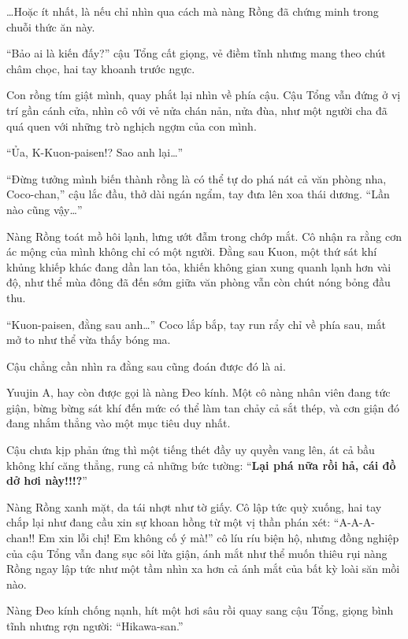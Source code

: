 \documentclass[../main.tex]{subfiles}
\begin{document}
\omk

\dots Hoặc ít nhất, là nếu chỉ nhìn qua cách mà nàng Rồng đã chứng minh trong chuỗi thức ăn này.

``Bảo ai là kiến đấy?'' cậu Tổng cất giọng, vẻ điềm tĩnh nhưng mang theo chút châm chọc, hai tay khoanh trước ngực.

Con rồng tím giật mình, quay phắt lại nhìn về phía cậu. Cậu Tổng vẫn đứng ở vị trí gần cánh cửa, nhìn cô với vẻ nửa chán nản, nửa đùa, như một người cha đã quá quen với những trò nghịch ngợm của con mình.

``Ủa, K-Kuon-paisen!? Sao anh lại\dots''

``Đừng tưởng mình biến thành rồng là có thể tự do phá nát cả văn phòng nha, Coco-chan,'' cậu lắc đầu, thở dài ngán ngẩm, tay đưa lên xoa thái dương. ``Lần nào cũng vậy\dots''

Nàng Rồng toát mồ hôi lạnh, lưng ướt đẫm trong chớp mắt. Cô nhận ra rằng cơn ác mộng của mình không chỉ có một người. Đằng sau Kuon, một thứ sát khí khủng khiếp khác đang dần lan tỏa, khiến không gian xung quanh lạnh hơn vài độ, như thể mùa đông đã đến sớm giữa văn phòng vẫn còn chút nóng bỏng đầu thu.

``Kuon-paisen, đằng sau anh\dots'' Coco lắp bắp, tay run rẩy chỉ về phía sau, mắt mở to như thể vừa thấy bóng ma.

Cậu chẳng cần nhìn ra đằng sau cũng đoán được đó là ai.

Yuujin A, hay còn được gọi là nàng Đeo kính. Một cô nàng nhân viên đang tức giận, bừng bừng sát khí đến mức có thể làm tan chảy cả sắt thép, và cơn giận đó đang nhắm thẳng vào một mục tiêu duy nhất.

Cậu chưa kịp phản ứng thì một tiếng thét đầy uy quyền vang lên, át cả bầu không khí căng thẳng, rung cả những bức tường: ``\textbf{Lại phá nữa rồi hả, cái đồ dở hơi này!!!?}''

Nàng Rồng xanh mặt, da tái nhợt như tờ giấy. Cô lập tức quỳ xuống, hai tay chắp lại như đang cầu xin sự khoan hồng từ một vị thần phán xét: ``A-A-A-chan!! Em xin lỗi chị! Em không cố ý mà!'' cô líu ríu biện hộ, nhưng đồng nghiệp của cậu Tổng vẫn đang sục sôi lửa giận, ánh mắt như thể muốn thiêu rụi nàng Rồng ngay lập tức như một tầm nhìn xa hơn cả ánh mắt của bất kỳ loài săn mồi nào.

Nàng Đeo kính chống nạnh, hít một hơi sâu rồi quay sang cậu Tổng, giọng bình tĩnh nhưng rợn người: ``Hikawa-san.''
\end{document}
